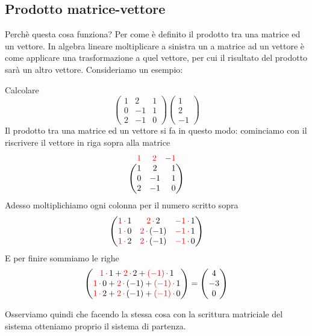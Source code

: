 \documentclass{article}     %
\begin{document}
\subsection{Prodotto matrice-vettore}
Perchè questa cosa funziona? Per come è definito il prodotto tra una matrice ed un vettore. In algebra lineare moltiplicare a sinistra un a matrice ad un vettore è come applicare una trasformazione a quel vettore, per cui il risultato del prodotto sarà un altro vettore. Consideriamo un esempio:
\begin{ex}
    Calcolare \[\begin{pmatrix} 1 & 2 & 1\\0 & - 1 & 1\\ 2 & -1 & 0\end{pmatrix} \begin{pmatrix} 1\\2\\- 1 \end{pmatrix} \]
    Il prodotto tra una matrice ed un vettore si fa in questo modo: cominciamo con il riscrivere il vettore in riga sopra alla matrice
    \[\begin{array}{c}
        {\color{red}
        \begin{matrix}
            1&~2&- 1
        \end{matrix}}\\
        \begin{pmatrix}
            1 & 2 & ~1\\0 & - 1 & ~1\\ 2 & -1 & ~0 
        \end{pmatrix}
    \end{array}\]
    Adesso moltiplichiamo ogni colonna per il numero scritto sopra
    \[
        \begin{pmatrix}
            {\color{red}1\,\cdot\,}1 & {\color{red} 2\,\cdot\,}2 & {\color{red} -1\,\cdot\,}1\\
            {\color{red}1\,\cdot\,}0 & {\color{red} 2\,\cdot\,}(- 1) & {\color{red} -1\,\cdot\,}1\\ 
            {\color{red}1\,\cdot\,}2 & {\color{red} 2\,\cdot\,}( - 1) & {\color{red} -1\,\cdot\,}0 
        \end{pmatrix}
    \]
    E per finire sommiamo le righe
    \[
    \begin{pmatrix}
        {\color{red}1\,\cdot\,}1 + {\color{red} 2\,\cdot\,}2 + {\color{red} ( - 1)\,\cdot\,}1\\
        {\color{red}1\,\cdot\,}0 + {\color{red} 2\,\cdot\,}(- 1) + {\color{red} ( - 1)\,\cdot\,}1\\ 
        {\color{red}1\,\cdot\,}2 + {\color{red} 2\,\cdot\,}( - 1) + {\color{red} ( - 1)\,\cdot\,}0 
    \end{pmatrix} = \begin{pmatrix} 4\\- 3\\0 \end{pmatrix} 
    \]
\end{ex}
Osserviamo quindi che facendo la stessa cosa con la scrittura matriciale del sistema otteniamo proprio il sistema di partenza.
\end{document}
